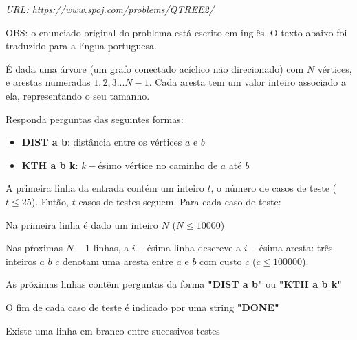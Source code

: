 {

\textit{URL: \url{https://www.spoj.com/problems/QTREE2/}}

\vspace{0.3cm}OBS: o enunciado original do problema está escrito em inglês. O texto abaixo foi traduzido para a língua portuguesa.\vspace{0.3cm}

\begin{mdframed}[backgroundcolor=blue!5]
\vspace{-0.5cm}

\vspace{0.2cm}

É dada uma árvore (um grafo conectado acíclico não direcionado) com $N$ vértices, e arestas numeradas $1, 2, 3...N-1$. Cada aresta tem um valor inteiro associado a ela, representando o seu tamanho.

Responda perguntas das seguintes formas:

\begin{itemize}
    \item \textbf{DIST a b}: distância entre os vértices $a$ e $b$
    \item \textbf{KTH a b k}: $k-$ésimo vértice no caminho de $a$ até $b$
\end{itemize}

\vspace{0.2cm}

A primeira linha da entrada contém um inteiro $t$, o número de casos de teste ($t \leq 25$). Então, $t$ casos de testes seguem. Para cada caso de teste: \vspace{0.1cm}

Na primeira linha é dado um inteiro $N$ ($N \leq 10000$)

Nas pŕoximas $N-1$ linhas, a $i-$ésima linha descreve a $i-$ésima aresta: três inteiros $a$ $b$ $c$ denotam uma aresta entre $a$ e $b$ com custo $c$ ($c \leq 100000$).

As próximas linhas contêm perguntas da forma \textbf{"DIST a b"} ou \textbf{"KTH a b k"}

O fim de cada caso de teste é indicado por uma string \textbf{"DONE"}

Existe uma linha em branco entre sucessivos testes

\vspace{0.2cm}


\end{mdframed}}
